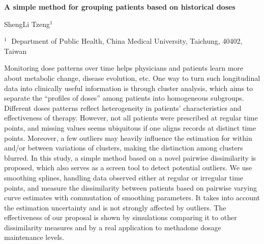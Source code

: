 \documentclass[12pt]{article}
\begin{document}
\begin{flushleft}


{\LARGE\bf A simple method for grouping patients based on historical doses}


\vspace{1.0cm}

ShengLi Tzeng$^1$

\begin{description}

\item $^1 \;$ Department of Public Health, China Medical University,
Taichung, 40402, Taiwan

\end{description}

\end{flushleft}


\vspace{0.75cm}


Monitoring dose patterns over time helps physicians and patients learn more about metabolic change, disease evolution, etc. One way to turn such longitudinal data into clinically useful information is through cluster analysis, which aims to separate the ``profiles of doses'' among patients into homogeneous subgroups. Different doses patterns reflect heterogeneity in patients' characteristics and effectiveness of therapy.  However, not all patients were prescribed at regular time points, and missing values seems ubiquitous if one aligns records at distinct time points. Moreover, a few outliers may heavily influence the estimation for within and/or between variations of clusters, making the distinction among clusters blurred. In this study, a simple method based on a novel pairwise dissimilarity is proposed, which also serves as a screen tool to detect potential outliers. We use smoothing splines, handling data observed either at regular or irregular time points, and measure the dissimilarity between patients based on pairwise varying curve estimates with  commutation of smoothing parameters. It takes into account the estimation uncertainty  and is not strongly affected by outliers. The effectiveness of our proposal is shown by simulations comparing it to other dissimilarity measures and by a real application to methadone dosage maintenance levels. 

\vskip 2mm
\end{document}
